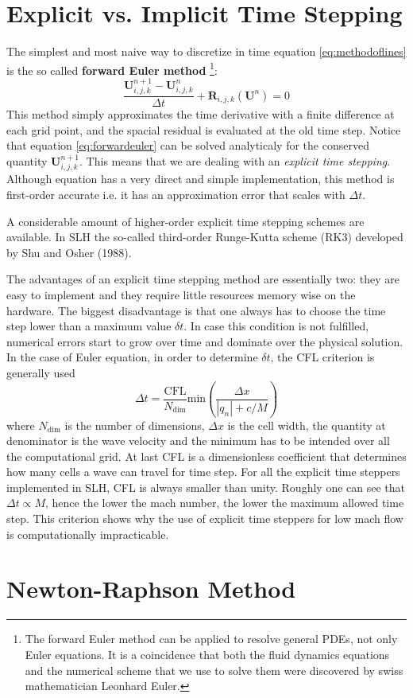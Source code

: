 \section{Explicit vs. Implicit Time Stepping}
The simplest and most naive way to discretize in time equation \ref{eq:methodoflines} is the so called \textbf{forward Euler method} \footnote{The forward Euler method can be applied to resolve general PDEs, not only Euler equations. It is a coincidence that both the fluid dynamics equations and the numerical scheme that we use to solve them were discovered by swiss mathematician Leonhard Euler.}:
\begin{equation}\label{eq:forwardeuler}
	\frac{\mathbf{U}^{n+1}_{i, j, k} - \mathbf{U}^{n}_{i, j, k}}{\Delta t} + \mathbf{R}_{i, j, k}(\mathbf{U}^n)=0
\end{equation}
This method simply approximates the time derivative with a finite difference at each grid point, and the spacial residual is evaluated at the old time step. Notice that equation \ref{eq:forwardeuler} can be solved analyticaly for the conserved quantity $\mathbf{U}^{n+1}_{i, j, k}$. This means that we are dealing with an \textit{explicit time stepping}. Although equation \label{eq:forwardeuler} has a very direct and simple implementation, this method is first-order accurate i.e. it has an approximation error that scales with $\Delta t$.

A considerable amount of higher-order explicit time stepping schemes are available. In SLH the so-called third-order Runge-Kutta scheme (RK3) developed by Shu and Osher (1988). 

The advantages of an explicit time stepping method are essentially two: they are easy to implement and they require little resources memory wise on the hardware. The biggest disadvantage is that one always has to choose the time step lower than a maximum value $\delta t$. In case this condition is not fulfilled, numerical errors start to grow over time and dominate over the physical solution. In the case of Euler equation, in order to determine $\delta t$, the CFL criterion is generally used
\begin{equation}\label{eq:cfl}
	\Delta t = \frac{\mathrm{CFL}}{N_{\mathrm{dim}}}\mathrm{min} \left(  \frac{\Delta x}{|q_n| + c/M}   \right)
\end{equation}
where $N_{\mathrm{dim}}$ is the number of dimensions, $\Delta x$ is the cell width, the quantity at denominator is the wave velocity and the minimum has to be intended over all the computational grid. At last CFL is a dimensionless coefficient that determines how many cells a wave can travel for time step. For all the explicit time steppers implemented in SLH, CFL is always smaller than unity. Roughly one can see that $\Delta t \propto M$, hence the lower the mach number, the lower the maximum allowed time step. This criterion shows why the use of explicit time steppers for low mach flow is computationally impracticable.


\section{Newton-Raphson Method}

